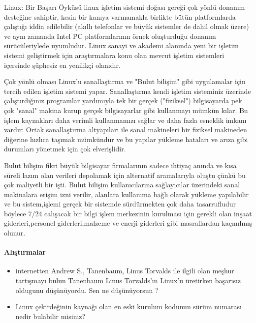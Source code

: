 \begin{section}{Linux: Bir Başarı Öyküsü}
linux işletim sistemi doğası gereği çok yönlü donanım desteğine sahiptir, kesin bir kanıya varmamakla birlikte bütün platformlarda çalıştığı iddia edilebilir (akıllı telefonlar ve büyük sistemler de dahil olmak üzere) ve aynı zamanda Intel PC platformlarının örnek oluşturduğu donanım sürücüleriylede uyumludur. Linux sanayi ve akademi alanında  yeni bir işletim sistemi geliştirmek için araştırmalara konu olan  mevcut işletim sistemleri içersinde şüphesiz en yenilikçi olanıdır.

Çok yönlü olması Linux'u sanallaştırma ve "Bulut bilişim" gibi uygulamalar için tercih edilen işletim sistemi yapar. Sanallaştırma kendi işletim sisteminiz üzerinde çalıştırdığınız programlar yardımıyla tek bir gerçek ("fiziksel") bilgisayarda  pek çok "sanal" makina kurup  gerçek bilgisayarlar gibi kullanmayı mümkün kılar. Bu işlem kaynakları daha verimli kullanmamızı sağlar ve daha fazla esneklik imkanı vardır: Ortak sanallaştırma altyapıları ile sanal makineleri bir fiziksel makineden diğerine hızlıca taşımak mümkündür ve bu yapılar yükleme hataları ve arıza gibi durumları yönetmek için çok elverişlidir.

Bulut bilişim fikri büyük bilgisayar firmalarının sadece ihtiyaç anında ve kısa süreli lazım olan verileri depolamak için alternatif aramalarıyla oluştu çünkü bu çok maliyetli bir işti. Bulut bilişim kullanıcılarına sağlayıcılar üzerindeki sanal makinalara erişim izni verilir, alanlara kullanıma bağlı olarak yükleme yapılabilir ve bu sistem,işlemi gerçek bir sistemde sürdürmekten çok daha tasarrufludur böylece 7/24 calışacak bir bilgi işlem merkezinin kurulması için gerekli olan inşaat giderleri,personel giderleri,malzeme ve enerji giderleri gibi masraflardan kaçınılmış olunur.
\paragraph{Alıştırmalar}{
\begin{itemize}
 \item internetten Andrew S., Tanenbaum, Linus Torvalds ile ilgili olan meşhur tartışmayı bulun Tanenbaum Linus Torvalds'ın Linux'u üretirken başarısız oldugunu düşünüyordu. Sen ne düşünüyorsun ?
 \item Linux çekirdeğinin kaynağı olan en eski kurulum kodunun sürüm numarası nedir bulabilir misiniz?
\end{itemize}}
\end{section}
